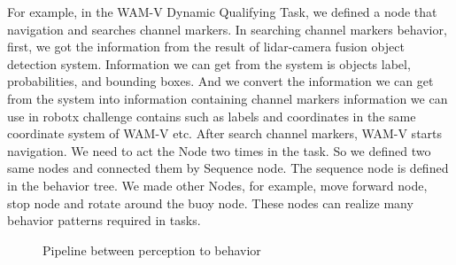 \documentclass[lettersize,journal]{IEEEtran}
\begin{document}
For example, in the WAM-V Dynamic Qualifying Task, 
we defined a node that navigation and searches channel markers.
In searching channel markers behavior, first, we got the information from the result of lidar-camera fusion object detection system. 
Information we can get from the system is objects label, probabilities, and bounding boxes.
And we convert the information we can get from the system into information containing channel markers information 
we can use in robotx challenge contains such as labels and coordinates in the same coordinate system of WAM-V etc.
After search channel markers, WAM-V starts navigation.
We need to act the Node two times in the task. So we defined two same nodes and connected them by Sequence node. 
The sequence node is defined in the behavior tree.
We made other Nodes, for example, move forward node, stop node and rotate around the buoy node.
These nodes can realize many behavior patterns required in tasks.

\begin{figure}[H]
    \begin{center}
    \end{center}
    \caption{Pipeline between perception to behavior}
    \label{fig:behavior_flow}
  \end{figure}
\end{document}
